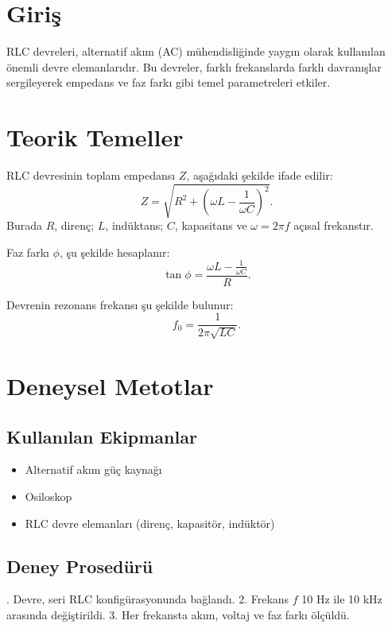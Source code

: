 \documentclass[11pt,letterpaper,twocolumn]{fenbil}
\begin{document}
\section{Giriş}
\justify
RLC devreleri, alternatif akım (AC) mühendisliğinde yaygın olarak kullanılan önemli devre elemanlarıdır. Bu devreler, farklı frekanslarda farklı davranışlar sergileyerek empedans ve faz farkı gibi temel parametreleri etkiler. 

\section{Teorik Temeller}
\justify
RLC devresinin toplam empedansı \( Z \), aşağıdaki şekilde ifade edilir:
\begin{equation}
    Z = \sqrt{R^2 + \left( \omega L - \frac{1}{\omega C} \right)^2}.
\end{equation}
Burada \( R \), direnç; \( L \), indüktans; \( C \), kapasitans ve \( \omega = 2\pi f \) açısal frekanstır.

Faz farkı \( \phi \), şu şekilde hesaplanır:
\begin{equation}
    \tan \phi = \frac{\omega L - \frac{1}{\omega C}}{R}.
\end{equation}

Devrenin rezonans frekansı şu şekilde bulunur:
\begin{equation}
    f_0 = \frac{1}{2\pi \sqrt{LC}}.
\end{equation}

\section{Deneysel Metotlar}
\subsection{Kullanılan Ekipmanlar}
\begin{itemize}
    \item Alternatif akım güç kaynağı
    \item Osiloskop
    \item RLC devre elemanları (direnç, kapasitör, indüktör)
\end{itemize}

\subsection{Deney Prosedürü}
. Devre, seri RLC konfigürasyonunda bağlandı.  
2. Frekans \( f \) 10 Hz ile 10 kHz arasında değiştirildi.  
3. Her frekansta akım, voltaj ve faz farkı ölçüldü.
\end{document}
